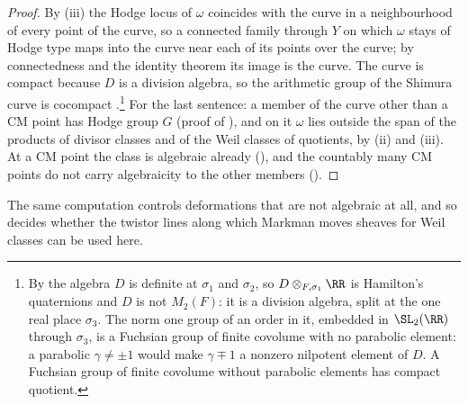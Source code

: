 \begin{proof}
By (iii) the Hodge locus of $\omega$ coincides with the
curve in a neighbourhood of every point of the curve, so a connected family
through $Y$ on which $\omega$ stays of Hodge type maps into the curve near
each of its points over the curve; by connectedness and the identity theorem
its image is the curve. The curve is compact because $D$ is a division
algebra, so the arithmetic group of the Shimura curve is cocompact
\cite{Mum69}.\footnote{By  the algebra $D$ is definite at
$\sigma_{1}$ and $\sigma_{2}$, so $D\otimes_{F,\sigma_{1}}\RR$ is Hamilton's
quaternions and $D$ is not $M_{2}(F)$: it is a division algebra, split at the
one real place $\sigma_{3}$. The norm one group of an order in it, embedded in
$\SL_{2}(\RR)$ through $\sigma_{3}$, is a Fuchsian group of finite covolume
with no parabolic element: a parabolic $\gamma\ne\pm1$ would make
$\gamma\mp1$ a nonzero nilpotent element of $D$. A Fuchsian group of finite
covolume without parabolic elements has compact quotient.} For the last sentence: a member of the curve other than a CM
point has Hodge group $G$ (proof of ), and on it
$\omega$ lies outside the span of the products of divisor classes and of the
Weil classes of quotients, by (ii) and (iii). At a
CM point the class is algebraic already (), and the
countably many CM points do not carry algebraicity to the other members
().
\end{proof}

The same computation controls deformations that are not algebraic at all,
and so decides whether the twistor lines along which Markman moves sheaves
for Weil classes can be used here.

